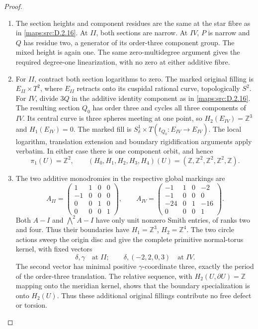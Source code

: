 \begin{proof}
\begin{enumerate}[label=\arabic*.,leftmargin=*]
\item The section heights and component residues are the same at
the star fibre as in \ref{maps:src:D.2.16}. At $II$, both sections are
narrow. At $IV$, $P$ is narrow and $Q$ has residue two,
a generator of its order-three component group.
The mixed height is again one. The same zero-multidegree
argument gives the required degree-one linearization, with
no zero at either additive fibre.

\item For $II$, contract both section logarithms to zero. The
marked original filling is $E_{II}\times T^2$, where
$E_{II}$ retracts onto its cuspidal rational curve,
topologically $S^2$. For $IV$, divide $3Q$ in the additive
identity component as in \ref{maps:src:D.2.16}. The resulting section
$Q_0$ has order three and cycles all three components of
$IV$. Its central curve is three spheres meeting at one
point, so $H_2(E_{IV})=\mathbb Z^3$ and $H_1(E_{IV})=0$.
The marked fill is
$S^1_\delta\times T(t_{Q_0}:E_{IV}\to E_{IV})$.
The local logarithm, translation extension and boundary
rigidification arguments apply verbatim. In either case
there is one component orbit, and hence
\[
 \pi_1(U)=\mathbb Z^2,\qquad
 (H_0,H_1,H_2,H_3,H_4)(U)
       =(\mathbb Z,\mathbb Z^2,\mathbb Z^2,\mathbb Z^2,\mathbb Z).
\]

\item The two additive monodromies in the respective global
markings are
\[
 A_{II}=\begin{pmatrix}
 1&1&0&0\\-1&0&0&0\\0&0&1&0\\0&0&0&1
 \end{pmatrix},\qquad
 A_{IV}=\begin{pmatrix}
 -1&1&0&-2\\-1&0&0&0\\-24&0&1&-16\\0&0&0&1
 \end{pmatrix}.
\]
Both $A-I$ and $\bigwedge^2A-I$ have only unit nonzero
Smith entries, of ranks two and four. Thus their boundaries
have $H_1=\mathbb Z^3$, $H_2=\mathbb Z^4$. The two circle
actions sweep the origin disc and give the complete
primitive normal-torus kernel, with fixed vectors
\[
 \delta,\gamma\quad\text{at }II;\qquad
 \delta,(-2,2,0,3)\quad\text{at }IV.
\]
The second vector has minimal positive $\gamma$-coordinate
three, exactly the period of the order-three translation.
The relative sequence, with $H_2(U,\partial U)=\mathbb Z$
mapping onto the meridian kernel, shows that the boundary
specialization is onto $H_2(U)$. Thus these additional
original fillings contribute no free defect or torsion.


\end{enumerate}
\end{proof}
